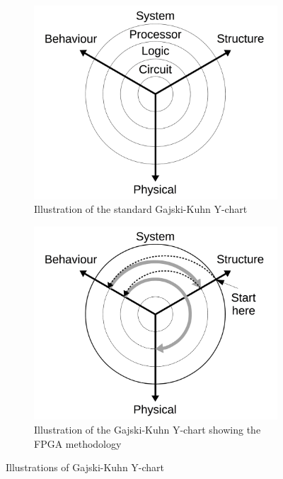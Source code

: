 \begin{figure}[ht]
  \centering
  \begin{subfigure}[t]{0.475\textwidth}
    \centering\includegraphics[width=\textwidth]{figures/ychart-std.jpg}
    \caption{Illustration of the standard Gajski-Kuhn Y-chart \cite{gajski2009}\label{fig:ychart_std}}
  \end{subfigure}\hspace{0.25cm}
  \begin{subfigure}[t]{0.475\textwidth}
    \centering\includegraphics[width=\textwidth]{figures/ychart-fpga.jpg}
    \caption{Illustration of the Gajski-Kuhn Y-chart showing the FPGA methodology \cite{gajski2009}  \label{fig:ychart_fpga}}
  \end{subfigure}\hspace{0.5cm}
  \caption{Illustrations of Gajski-Kuhn Y-chart\label{fig:ychartall}}
\end{figure}

